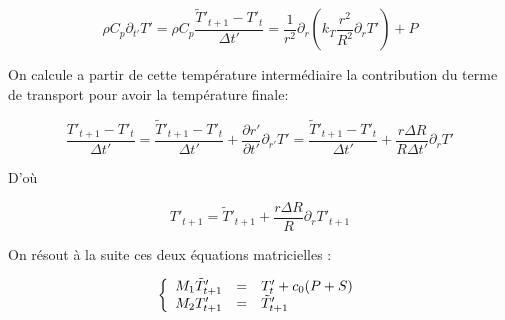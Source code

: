 \documentclass[10pt,a4paper]{article}
\numberwithin{equation}{section}
\begin{document}
\begin{equation}
\rho C_p \partial_{t'} T'= \rho C_p \frac{\tilde{T}'_{t+1} - T'_{t}}{\Delta t'} = \frac{1}{r^2} \partial_{r} ( k_{T} \frac{r^2}{R^2} \partial_{r} T')  + P
\end{equation}

On calcule a partir de cette température intermédiaire la contribution du terme de transport pour avoir la température finale:

\begin{equation}
\frac{T'_{t+1} - T'_{t}}{\Delta t'} = \frac{\tilde{T}'_{t+1} - T'_{t}}{\Delta t'} + \frac{\partial r'}{\partial t'} \partial_{r'} T' =  \frac{\tilde{T}'_{t+1} - T'_{t}}{\Delta t'} + \frac{r\Delta R}{R\Delta t'}\partial_{r} T'
\end{equation}

D'où

\begin{equation}
T'_{t+1}  = \tilde{T}'_{t+1} + \frac{r\Delta R}{R}\partial_{r} T'_{t+1}
\end{equation}

On résout à la suite ces deux équations matricielles :

\begin{equation}
\left\{
\begin{array}{r c l}
M_1 \tilde{T}'_{t+1} &=& T'_t + c_0 ( P + S )\\
M_2 T'_{t+1}   &=& \tilde{T}'_{t+1}\\
\end{array}
\right.
\end{equation}

\newpage

 
\end{document}
